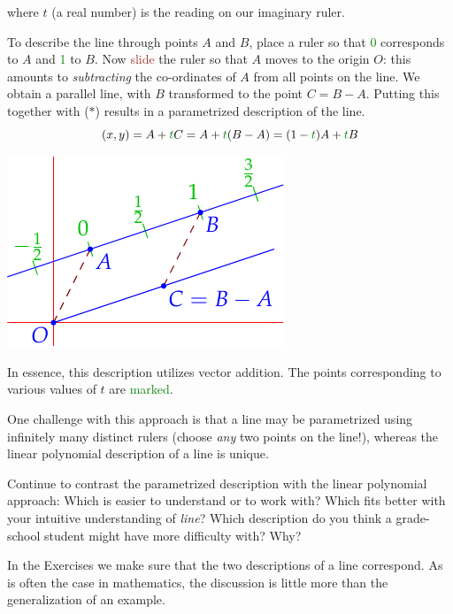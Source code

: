 \begin{minipage}[t]{0.65\linewidth}\vspace{-8pt}
	where $t$ (a real number) is the reading on our imaginary ruler.\par
	To describe the line through points $A$ and $B$, place a ruler so that \textcolor{Green}{0} corresponds to $A$ and \textcolor{Green}{1} to $B$. Now \textcolor{Brown}{slide} the ruler so that $A$ moves to the origin $O$: this amounts to \emph{subtracting} the co-ordinates of $A$ from all points on the line. We obtain a parallel line, with $B$ transformed to the point $C=B-A$. Putting this together with ($\ast$) results in a parametrized description of the line.
	\[
		(x,y) =A+\textcolor{Green}{t}C
		=A+\textcolor{Green}{t}(B-A)
		=(1-\textcolor{Green}{t})A+\textcolor{Green}{t}B
	\]
	\end{minipage}
	\hfill
	\begin{minipage}[t]{0.34\linewidth}\vspace{0pt}
		\flushright
		\includegraphics{line-line2}
	\end{minipage}\bigbreak

In essence, this description utilizes vector addition. The points corresponding to various values of $t$ are \textcolor{Green}{marked}.\medbreak

One challenge with this approach is that a line may be parametrized using infinitely many distinct rulers (choose \emph{any} two points on the line!), whereas the linear polynomial description of a line is unique.\medbreak

Continue to contrast the parametrized description with the linear polynomial approach: Which is easier to understand or to work with? Which fits better with your intuitive understanding of \emph{line}? Which description do you think a grade-school student might have more difficulty with? Why?\smallbreak

In the Exercises we make sure that the two descriptions of a line correspond. As is often the case in mathematics, the discussion is little more than the generalization of an example.


